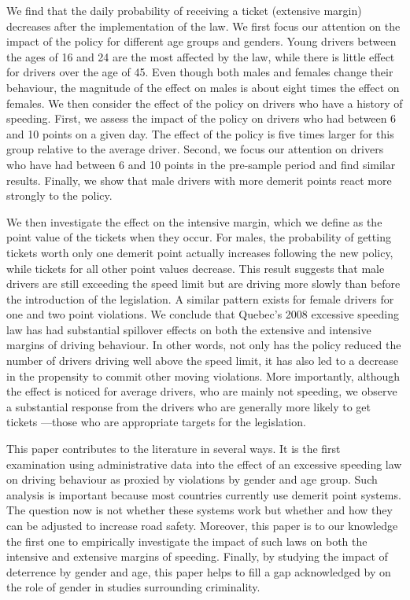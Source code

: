 \documentclass{cje}
\begin{document}
We find that the daily probability of receiving a ticket (extensive margin) 
decreases after the implementation of the law. We first focus our attention on the impact of the policy for different age groups and genders.
Young drivers between the ages of 16 and 24 are the most affected by the law, 
while there is little effect for drivers over the age of 45. 
Even though both males and females change their behaviour, the magnitude of the effect on males is about eight times the effect on females. 
We then consider the effect of the policy on drivers who have a history of speeding. First, we assess the impact of the policy on drivers who had between 6 and 10 points on a given day. The effect of the policy is five times larger for this group relative to the average driver. Second, we focus our attention on drivers who have had between 6 and 10 points in the pre-sample period and find similar results. Finally, we show that male drivers with more demerit points react more strongly to the policy.

We then investigate the effect on the intensive margin, which we define as the point value of the tickets when they occur. 
For males, the probability of getting tickets worth only one demerit point 
actually increases following the new policy, while tickets for all other point values decrease. 
This result suggests that male drivers are still exceeding the speed limit 
but are driving more slowly than before the introduction of the legislation. 
A similar pattern exists for female drivers for one and two point violations. 
%
We conclude that Quebec’s 2008 excessive speeding law has had substantial spillover effects 
on both the extensive and intensive margins of driving behaviour. 
In other words, not only has the policy reduced the number of drivers driving well above the speed limit, 
it has also led to a decrease in the propensity to commit other moving violations.
% 
More importantly, although the effect is noticed for average drivers, 
who are mainly not speeding, 
we observe a substantial response from the drivers who are generally more likely to get tickets%
---those who are appropriate targets for the legislation. 

This paper contributes to the literature in several ways. 
It is the first examination using administrative data into the effect of 
an excessive speeding law on driving behaviour 
as proxied by violations by gender and age group. 
Such analysis is important because most countries currently use demerit point systems. 
The question now is not whether these systems work 
but whether and how they can be adjusted to increase road safety. 
Moreover, this paper is to our knowledge the first one to empirically investigate 
the impact of such laws on both the intensive and extensive margins of speeding. 
Finally, by studying the impact of deterrence by gender and age, 
this paper helps to fill a gap acknowledged by 
\citet{freeman1999}
on the role of gender in studies surrounding criminality.
\end{document}
